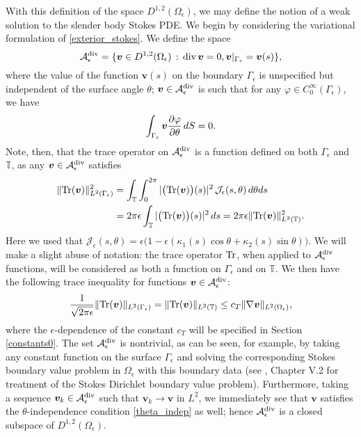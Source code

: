 \documentclass[11pt]{article}
\numberwithin{equation}{section}
\newcommand{\T}{\mathbb{T}}
\newcommand{\A}{\mathcal{A}}
\newcommand{\bv}{\bm{v}}
\newcommand{\p}{\partial}
\newcommand{\ts}{\thinspace}
\newcommand{\dive}{{\rm{div}}}
\theoremstyle{definition}
\begin{document}
With this definition of the space $D^{1,2}(\Omega_\epsilon)$, we may define the notion of a weak solution to the slender body Stokes PDE. We begin by considering the variational formulation of \eqref{exterior_stokes}. We define the space
\[ \A_{\epsilon}^{\dive}= \{\bv\in D^{1,2}(\Omega_{\epsilon}) \ts : \ts \dive \ts\bv = 0, \bv|_{\Gamma_{\epsilon}}=\bv(s) \}, \]
where the value of the function $\bv(s)$ on the boundary $\Gamma_{\epsilon}$ is unspecified but independent of the surface angle $\theta$; $\bv\in\A_{\epsilon}^{\dive}$ is such that for any $\varphi\in C_0^\infty(\Gamma_\epsilon)$, we have 
\begin{equation}\label{theta_indep} 
 \int_{\Gamma_\epsilon} \bv \frac{\p\varphi}{\p\theta} \ts dS =0.
 \end{equation} 
Note, then, that the trace operator on $\A_{\epsilon}^{\dive}$ is a function defined on both $\Gamma_\epsilon$ and $\T$, as any $\bv\in \A_{\epsilon}^{\dive}$ satisfies 
\begin{align*}
 \|{\rm Tr}(\bv)\|_{L^2(\Gamma_{\epsilon})}^2 &= \int_{\T}\int_0^{2\pi} |\big({\rm Tr}(\bv)\big)(s)|^2 \ts \mathcal{J}_{\epsilon}(s,\theta) \ts d\theta ds \\
 &= 2\pi\epsilon \int_{\T}|\big({\rm Tr}(\bv)\big)(s)|^2 \ts ds = 2\pi\epsilon \|{\rm Tr}(\bv)\|_{L^2(\T)}^2.
 \end{align*}
Here we used that $\mathcal{J}_{\epsilon}(s,\theta)= \epsilon \big(1-\epsilon(\kappa_1(s)\cos\theta+\kappa_2(s)\sin\theta) \big)$. We will make a slight abuse of notation: the trace operator $\rm{Tr}$, when applied to $\A_{\epsilon}^{\dive}$ functions, will be considered as both a function on $\Gamma_\epsilon$ and on $\T$. We then have the following trace inequality for functions $\bv\in \A_{\epsilon}^{\dive}$:
\begin{equation}\label{trace_Adiv}
\frac{1}{\sqrt{2\pi\epsilon}}\|{\rm Tr}(\bv)\|_{L^2(\Gamma_{\epsilon})}=\|{\rm Tr}(\bv)\|_{L^2(\T)} \le c_T \|\nabla\bv\|_{L^2(\Omega_{\epsilon})},
\end{equation}
where the $\epsilon$-dependence of the constant $c_T$ will be specified in Section \ref{constants0}. The set $\A_{\epsilon}^{\dive}$ is nontrivial, as can be seen, for example, by taking any constant function on the surface $\Gamma_{\epsilon}$ and solving the corresponding Stokes boundary value problem in $\Omega_{\epsilon}$ with this boundary data (see \cite{galdi2011introduction}, Chapter V.2 for treatment of the Stokes Dirichlet boundary value problem). Furthermore, taking a sequence $\bv_k\in\A_{\epsilon}^{\dive}$ such that $\bv_k\to\bv$ in $L^2$, we immediately see that $\bv$ satisfies the $\theta$-independence condition \eqref{theta_indep} as well; hence $\A_{\epsilon}^{\dive}$ is a closed subspace of $D^{1,2}(\Omega_{\epsilon})$. \\
\end{document}

